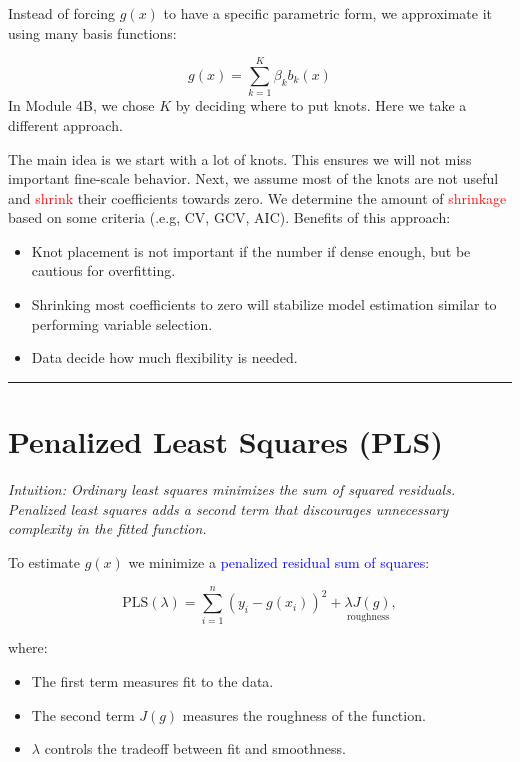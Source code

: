 \documentclass[
  letterpaper,
  DIV=11,
  numbers=noendperiod]{scrreprt}
\providecommand{\tightlist}{%
  \setlength{\itemsep}{0pt}\setlength{\parskip}{0pt}}\usepackage{longtable,booktabs,array}
\begin{document}
Instead of forcing \(g(x)\) to have a specific parametric form, we
approximate it using many basis functions:

\[
g(x) = \sum_{k=1}^K \beta_k b_k(x)
\] In Module 4B, we chose \(K\) by deciding where to put knots. Here we
take a different approach.

The main idea is we start with a lot of knots. This ensures we will not
miss important fine-scale behavior. Next, we assume most of the knots
are not useful and \textcolor{red}{shrink} their coefficients towards
zero. We determine the amount of \textcolor{red}{shrinkage} based on
some criteria (.e.g, CV, GCV, AIC). Benefits of this approach:

\begin{itemize}
\tightlist
\item
  Knot placement is not important if the number if dense enough, but be
  cautious for overfitting.
\item
  Shrinking most coefficients to zero will stabilize model estimation
  similar to performing variable selection.
\item
  Data decide how much flexibility is needed.
\end{itemize}

\begin{center}\rule{0.5\linewidth}{0.5pt}\end{center}

\hypertarget{penalized-least-squares-pls}{%
\section*{Penalized Least Squares
(PLS)}\label{penalized-least-squares-pls}}


\emph{Intuition: Ordinary least squares minimizes the sum of squared
residuals. Penalized least squares adds a second term that discourages
unnecessary complexity in the fitted function.}

To estimate \(g(x)\) we minimize a
\textcolor{blue}{penalized residual sum of squares}:

\[
\text{PLS}(\lambda) = \sum_{i=1}^{n} (y_i - g(x_i))^2 + \underset{\text{roughness}}{\lambda J(g)},
\]

where:

\begin{itemize}
\tightlist
\item
  The first term measures fit to the data.
\item
  The second term \(J(g)\) measures the roughness of the function.
\item
  \(\lambda\) controls the tradeoff between fit and smoothness.
\end{itemize}
\end{document}
